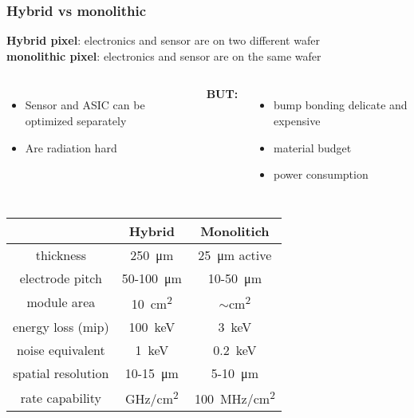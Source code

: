     \begin{frame}
        \frametitle{Hybrid vs monolithic}
        \textbf{Hybrid pixel}: electronics and sensor are on two different wafer\\
        \textbf{monolithic pixel}: electronics and sensor are on the same wafer\\ 
        \begin{columns}
                \begin{itemize}
                    \item Sensor and ASIC can be optimized separately
                    \item Are radiation hard
                \end{itemize}
                \textbf{BUT: }
                \begin{itemize}
                    \item bump bonding delicate and expensive
                    \item material budget
                    \item power consumption
                \end{itemize}
        \end{columns}
        \begin{table}
            \begin{center}
                \begin{tabular}{|c | c |  c |}
                \hline
                & Hybrid & Monolitich\\
                \hline
                \hline
                thickness & \SI{250}{\um} & \SI{25}{\um} active\\
                electrode pitch & 50-\SI{100}{\um} & 10-\SI{50}{\um}\\
                module area & \SI{10}{cm\squared} & $\sim$\si{cm\squared}\\
                energy loss (mip) & \SI{100}{keV} & \SI{3}{keV}\\
                noise equivalent & \SI{1}{keV} & \SI{0.2}{keV}\\
                spatial resolution & 10-\SI{15}{\um} & 5-\SI{10}{\um}\\
                rate capability & \si{GHz/cm\squared} & \SI{100}{MHz/cm\squared} \\
                \hline
                \end{tabular}
            \end{center}
        \end{table}

    \end{frame}